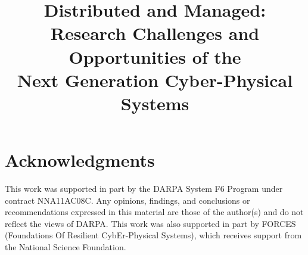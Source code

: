 \documentclass[10pt,journal]{IEEEtran}
\begin{document}
\title{Distributed and Managed: \\
Research Challenges and Opportunities of the \\
Next Generation Cyber-Physical Systems}
\author{
}

\maketitle











%

\section*{Acknowledgments} 
This work was supported in part by the DARPA System F6 Program
under contract NNA11AC08C. Any opinions, findings, and
conclusions or recommendations expressed in this material
are those of the author(s) and do not  reflect
the views of DARPA. This work was also supported in part by FORCES 
(Foundations Of Resilient CybEr-Physical Systems), 
which receives support from the National Science Foundation.

\balance
\begin{spacing}{0.88}


\end{spacing}
\end{document}
